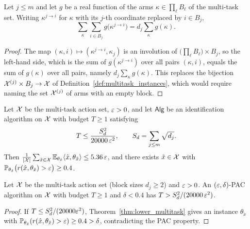 \begin{lemma}\label{lem:multitask_block_reindex}
\leanok
{}
Let $j \le m$ and let $g$ be a real function of the arms $\kappa \in \prod_\ell B_\ell$ of the
multi-task set. Writing $\kappa^{j\to i}$ for $\kappa$ with its $j$-th coordinate replaced by
$i \in B_j$,
\[
  \sum_{\kappa}\sum_{i\in B_j} g\big(\kappa^{j\to i}\big) = d_j \sum_\kappa g(\kappa) .
\]
\end{lemma}

\begin{proof}
\leanok
The map $(\kappa, i) \mapsto (\kappa^{j\to i}, \kappa_j)$ is an involution of
$\big(\prod_\ell B_\ell\big)\times B_j$, so the left-hand side, which is the sum of
$g(\kappa^{j\to i})$ over all pairs $(\kappa,i)$, equals the sum of $g(\kappa)$ over all pairs,
namely $d_j\sum_\kappa g(\kappa)$. This replaces the bijection
$\mathcal{X}^{(j)}\times B_j \to \mathcal{X}$ of Definition~\ref{def:multitask_instances}, which would require
naming the set $\mathcal{X}^{(j)}$ of arms with an empty block.
\end{proof}

\begin{theorem}\label{thm:lower_multitask}
\leanok
{}
Let $\mathcal{X}$ be the multi-task action set, $\varepsilon > 0$, and let $\mathsf{Alg}$ be an
identification algorithm on $\mathcal{X}$ with budget $T \ge 1$ satisfying
\[
  T \le \frac{S_d^2}{20000\,\varepsilon^2}, \qquad S_d = \sum_{j\le m}\sqrt{d_j}.
\]
Then $\frac{1}{\lvert \mathcal{X} \rvert}\sum_{\tilde x\in\mathcal{X}}\mathbb{E}_{\theta_{\tilde x}}\langle \hat{x}, \theta_{\tilde x} \rangle \le 5.36\,\varepsilon$,
and there exists $\tilde x \in \mathcal{X}$ with
$\mathbb{P}_{\theta_{\tilde x}}\big(r(\hat{x},\theta_{\tilde x}) > \varepsilon\big) \ge 0.4$.
\end{theorem}

\begin{corollary}\label{cor:lower_multitask_pac}
\leanok
{}
Let $\mathcal{X}$ be the multi-task action set (block sizes $d_j \ge 2$) and $\varepsilon > 0$. An
$(\varepsilon,\delta)$-PAC algorithm on $\mathcal{X}$ with budget $T \ge 1$ and $\delta < 0.4$ has
$T > S_d^2/(20000\,\varepsilon^2)$.
\end{corollary}
\begin{proof}
\leanok
{}
If $T \le S_d^2/(20000\varepsilon^2)$, Theorem~\ref{thm:lower_multitask} gives an instance
$\theta_{\tilde x}$ with $\mathbb{P}_{\theta_{\tilde x}}(r(\hat{x},\theta_{\tilde x}) > \varepsilon) \ge 0.4 > \delta$,
contradicting the PAC property.
\end{proof}

